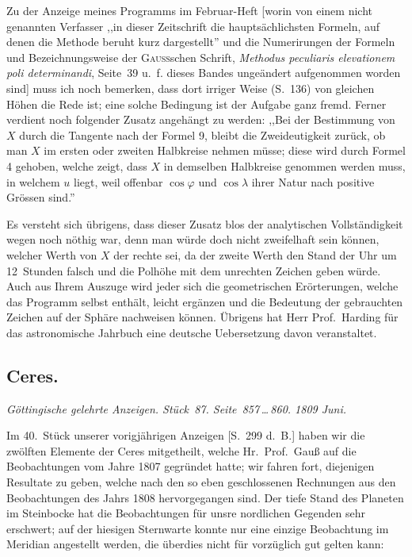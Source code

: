 \documentclass[12pt,a4paper]{book}
\begin{document}
Zu der Anzeige meines Programms im Februar-Heft [worin von einem nicht genannten Verfasser ,,in dieser Zeitschrift die haupts\"achlichsten Formeln, auf denen die Methode beruht kurz dargestellt'' und die Numerirungen der Formeln und Bezeichnungsweise der \textsc{Gauss}schen Schrift, \textit{Methodus peculiaris elevationem poli determinandi}, Seite~39 u.~f. dieses Bandes unge\"andert aufgenommen worden sind] muss ich noch bemerken, dass dort irriger Weise (S.~136) von gleichen H\"ohen die Rede ist; eine solche Bedingung ist der Aufgabe ganz fremd. Ferner verdient noch folgender Zusatz angeh\"angt zu werden: ,,Bei der Bestimmung von $X$ durch die Tangente nach der Formel 9, bleibt die Zweideutigkeit zur\"uck, ob man $X$ im ersten oder zweiten Halbkreise nehmen m\"usse; diese wird durch Formel 4 gehoben, welche zeigt, dass $X$ in demselben Halbkreise genommen werden muss, in welchem $u$ liegt, weil offenbar $\cos\varphi$ und $\cos\lambda$ ihrer Natur nach positive Gr\"ossen sind.''

Es versteht sich \"ubrigens, dass dieser Zusatz blos der analytischen Vollst\"andigkeit wegen noch n\"othig war, denn man w\"urde doch nicht zweifelhaft sein k\"onnen, welcher Werth von $X$ der rechte sei, da der zweite Werth den Stand der Uhr um 12~Stunden falsch und die Polh\"ohe mit dem unrechten Zeichen geben w\"urde. Auch aus Ihrem Auszuge wird jeder sich die geometrischen Er\"orterungen, welche das Programm selbst enth\"alt, leicht erg\"anzen und die Bedeutung der gebrauchten Zeichen auf der Sph\"are nachweisen k\"onnen. \"Ubrigens hat Herr Prof.~Harding f\"ur das astronomische Jahrbuch eine deutsche Uebersetzung davon veranstaltet.


\newpage
\subsection*{Ceres.}

\textit{G\"ottingische gelehrte Anzeigen. St\"uck~87. Seite~857\,\ldots\,860. 1809 Juni.}

Im 40.~St\"uck unserer vorigj\"ahrigen Anzeigen [S.~299 d.~B.] haben wir die zw\"olften Elemente der Ceres mitgetheilt, welche Hr.~Prof.~Gau{\ss} auf die Beobachtungen vom Jahre 1807 gegr\"undet hatte; wir fahren fort, diejenigen Resultate zu geben, welche nach den so eben geschlossenen Rechnungen aus den Beobachtungen des Jahrs 1808 hervorgegangen sind. Der tiefe Stand des Planeten im Steinbocke hat die Beobachtungen f\"ur unsre nordlichen Gegenden sehr erschwert; auf der hiesigen Sternwarte konnte nur eine einzige Beobachtung im Meridian angestellt werden, die \"uberdies nicht f\"ur vorz\"uglich gut gelten kann:
\end{document}

